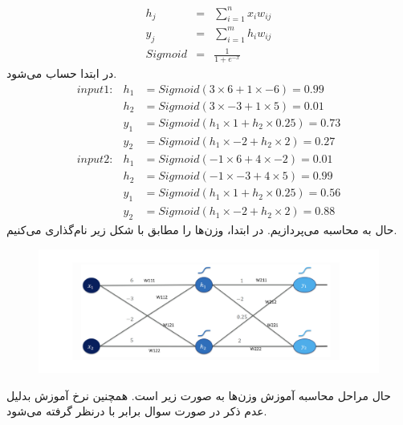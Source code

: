 \documentclass[12pt]{article}
\begin{document}
	\begin{eqnarray}
		h_{j} & = & \sum_{i=1}^n x_{i}w_{ij} \\
		y_{j} & = & \sum_{i=1}^m h_{i}w_{ij} \\
		Sigmoid & = & \frac{1}{1 + e^{-x}}
	\end{eqnarray}
	در ابتدا  حساب می‌شود.
	\begin{eqnarray}
		input 1 :&h_{1}&=Sigmoid(3 \times 6 + 1 \times -6)= 0.99\\
		 &h_{2}&=Sigmoid(3\times-3+1\times5)=0.01 \\
		 &y_{1}&=Sigmoid(h_{1}\times1+h_{2}\times0.25)=0.73\\
		 &y_{2}&=Sigmoid(h_{1}\times-2+h_{2}\times2)=0.27\\
		 input 2 :&h_{1}&=Sigmoid(-1\times6+4\times-2)=0.01\\
		 &h_{2}&=Sigmoid(-1\times-3+4\times5)=0.99\\
		 &y_{1}&=Sigmoid(h_{1}\times1+h_{2}\times0.25)=0.56\\
		 &y_{2}&=Sigmoid(h_{1}\times-2+h_{2}\times2)=0.88
	\end{eqnarray}
	حال به محاسبه  می‌پردازیم. در ابتدا، وزن‌ها را مطابق با شکل زیر نام‌گذاری می‌کنیم.
	\begin{figure}[H]
		\centering
		\includegraphics[scale=0.3]{pic_1.png}
	\end{figure}
	حال مراحل محاسبه آموزش وزن‌ها به صورت زیر است. همچنین نرخ آموزش بدلیل عدم ذکر در صورت سوال برابر با  درنظر گرفته می‌شود.
	
\end{document}
